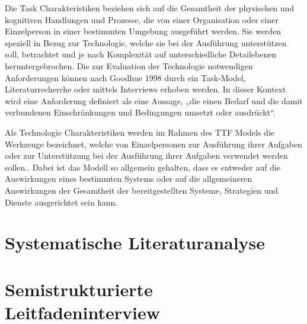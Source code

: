 
Die Task Charakteristiken beziehen sich auf die Gesamtheit der physischen und kognitiven Handlungen und Prozesse, die von einer Organisation oder einer Einzelperson in einer bestimmten Umgebung ausgeführt werden. Sie werden speziell in Bezug zur Technologie, welche sie bei der Ausführung unterstützen soll, betrachtet und je nach Komplexität auf unterschiedliche Detailebenen heruntergebrochen. \autocite[Vgl.][S. 398]{SPIES2020} Die zur Evaluation der Technologie notwendigen Anforderungen können nach Goodhue 1998 durch ein Task-Model, Literaturrecherche oder mittels Interviews erhoben werden. \autocite[Vgl.][S. 126]{GOODHUE1998} In dieser Kontext wird eine Anforderung definiert als eine Aussage, „die einen Bedarf und die damit verbundenen Einschränkungen und Bedingungen umsetzt oder ausdrückt“. \autocite[Vgl.][]{ISO2017}

Als Technologie Charakteristiken werden im Rahmen des TTF Models die Werkzeuge bezeichnet, welche von Einzelpersonen zur Ausführung ihrer Aufgaben oder zur Unterstützung bei der Ausführung ihrer Aufgaben verwendet werden sollen.\autocite[Vgl.][S. 216]{GOODHUE1995}. Dabei ist das Modell so allgemein gehalten, dass es entweder auf die Auswirkungen eines bestimmten Systems oder auf die allgemeineren Auswirkungen der Gesamtheit der bereitgestellten Systeme, Strategien und Dienste ausgerichtet sein kann. \autocite[Vgl.][S. 399]{SPIES2020}




\newpage
\section{Systematische Literaturanalyse}
\newpage
\section{Semistrukturierte Leitfadeninterview}
\newpage